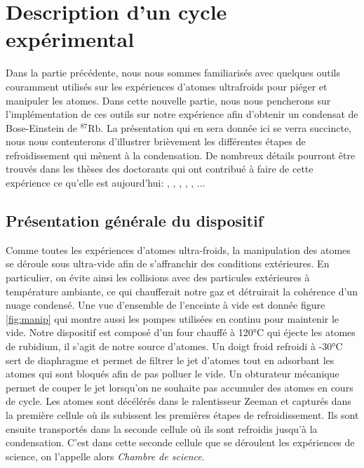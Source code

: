 \section{Description d'un cycle expérimental}
Dans la partie précédente, nous nous sommes familiarisés avec quelques outils couramment utilisés sur les expériences d'atomes ultrafroids pour piéger et manipuler les atomes. Dans cette nouvelle partie, nous nous pencherons sur l'implémentation de ces outils sur notre expérience afin d'obtenir un condensat de Bose-Einstein de ${}^{87}$Rb. La présentation qui en sera donnée ici se verra succincte, nous nous contenterons d'illustrer brièvement les différentes étapes de refroidissement qui mènent à la condensation. De nombreux détails pourront être trouvés dans les thèses des doctorants qui ont contribué à faire de cette expérience ce qu'elle est aujourd'hui: \citep{fauquembergue2004realisation}, \citep{riou2006etude}, \citep{bernard2010transport}, \citep{jendrzejewski2012quantum}, \citep{muller2015coherent}, \citep{denechaud2018vers}... 

\subsection{Présentation générale du dispositif}
Comme toutes les expériences d'atomes ultra-froids, la manipulation des atomes se déroule sous ultra-vide afin de s'affranchir des conditions extérieures. En particulier, on évite ainsi les collisions avec des particules extérieures à température ambiante, ce qui chaufferait notre gaz et détruirait la cohérence d'un nuage condensé. Une vue d'ensemble de l'enceinte à vide est donnée figure \ref{fig:manip} qui montre aussi les pompes utilisées en continu pour maintenir le vide. Notre dispositif est composé d'un four chauffé à 120°C qui éjecte les atomes de rubidium, il s'agit de notre source d'atomes. Un doigt froid refroidi à -30°C sert de diaphragme et permet de filtrer le jet d'atomes tout en adsorbant les atomes qui sont bloqués afin de pas polluer le vide. Un obturateur mécanique permet de couper le jet lorsqu'on ne souhaite pas accumuler des atomes en cours de cycle. Les atomes sont décélérés dans le ralentisseur Zeeman et capturés dans la première cellule où ils subissent les premières étapes de refroidissement. Ils sont ensuite transportés dans la seconde cellule où ils sont refroidis jusqu'à la condensation. C'est dans cette seconde cellule que se déroulent les expériences de science, on l'appelle alors \emph{Chambre de science}.

